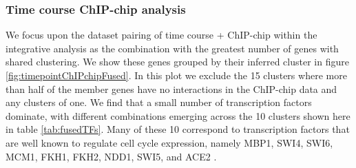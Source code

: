 \documentclass[]{article}
\begin{document}

\subsubsection{Time course ChIP-chip analysis}

We focus upon the dataset pairing of time course + ChIP-chip within the integrative analysis as the combination with the greatest number of genes with shared clustering. We show these genes grouped by their inferred cluster in figure \ref{fig:timepointChIPchipFused}. In this plot we exclude the 15 clusters where more than half of the member genes have no interactions in the ChIP-chip data and any clusters of one. We find that a small number of transcription factors dominate, with different combinations emerging across the 10 clusters shown here in table \ref{tab:fusedTFs}. Many of these 10 correspond to transcription factors that are well known to regulate cell cycle expression, namely MBP1, SWI4, SWI6, MCM1, FKH1, FKH2, NDD1, SWI5, and ACE2 \citep{simon2001serial}.
\end{document}
